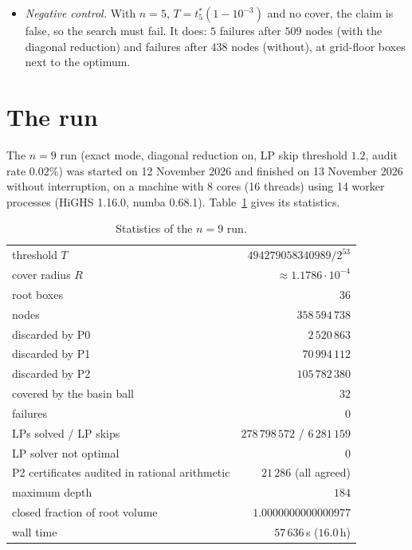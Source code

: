 \documentclass[11pt]{amsart}
\theoremstyle{definition}
\newcommand{\tstar}{t^{*}}
\begin{document}
\begin{itemize}
\item \emph{Negative control.} With $n = 5$, $T = \tstar_5(1-10^{-3})$ and no cover, the claim is false, so the search must fail. It does: $5$ failures after $509$ nodes (with the diagonal reduction) and failures after $438$ nodes (without), at grid-floor boxes next to the optimum. %
\end{itemize}

\section{The run}\label{sec:run}

The $n = 9$ run (exact mode, diagonal reduction on, LP skip threshold $1.2$, audit rate $0.02\%$) was started on 12 November 2026 and finished on 13 November 2026 without interruption, on a machine with 8 cores (16 threads) using 14 worker processes (HiGHS 1.16.0, numba 0.68.1). Table~\ref{tab:run} gives its statistics. %

\begin{table}[htbp]
\centering\small
\caption{Statistics of the $n = 9$ run.}\label{tab:run}
\begin{tabular}{@{}lr@{}}
\toprule
threshold $T$ & $494279058340989/2^{53}$ \\
cover radius $R$ & $\approx 1.1786\cdot10^{-4}$ \\
root boxes & $36$ \\
nodes & $358\,594\,738$ \\
\quad discarded by P0 & $2\,520\,863$ \\
\quad discarded by P1 & $70\,994\,112$ \\
\quad discarded by P2 & $105\,782\,380$ \\
\quad covered by the basin ball & $32$ \\
\quad failures & $0$ \\
LPs solved / LP skips & $278\,798\,572$ / $6\,281\,159$ \\
LP solver not optimal & $0$ \\
P2 certificates audited in rational arithmetic & $21\,286$ (all agreed) \\
maximum depth & $184$ \\
closed fraction of root volume & $1.0000000000000977$ \\
wall time & $57\,636$\,s ($16.0$\,h) \\
\bottomrule
\end{tabular}
\end{table}
\end{document}
